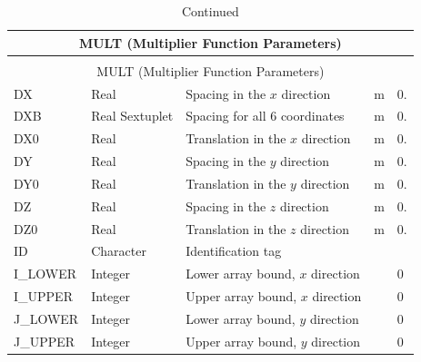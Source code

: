 \documentclass[11pt]{book}
\begin{document}
\begin{longtable}{@{\extracolsep{\fill}}|l|l|l|l|l|}
\caption[Multiplier function parameters ({\ct MULT} namelist group)]{For more information see Section~\ref{info:MULT}.}
\label{tbl:MULT} \\
\hline
\multicolumn{5}{|c|}{{\ct MULT} (Multiplier Function Parameters)} \\
\hline \hline
\endfirsthead
\caption[]{Continued} \\
\hline
\multicolumn{5}{|c|}{{\ct MULT} (Multiplier Function Parameters)} \\
\hline \hline
\endhead
{\ct DX}             & Real             & Spacing in the $x$ direction                & m  & 0.                         \\ \hline
{\ct DXB}            & Real Sextuplet   & Spacing for all 6 coordinates               & m  & 0.                         \\ \hline
{\ct DX0}            & Real             & Translation in the $x$ direction            & m  & 0.                         \\ \hline
{\ct DY}             & Real             & Spacing in the $y$ direction                & m  & 0.                         \\ \hline
{\ct DY0}            & Real             & Translation in the $y$ direction            & m  & 0.                         \\ \hline
{\ct DZ}             & Real             & Spacing in the $z$ direction                & m  & 0.                         \\ \hline
{\ct DZ0}            & Real             & Translation in the $z$ direction            & m  & 0.                         \\ \hline
{\ct ID }            & Character        & Identification tag                          &    &                            \\ \hline
{\ct I\_LOWER}       & Integer          & Lower array bound, $x$ direction            &    & 0                          \\ \hline
{\ct I\_UPPER}       & Integer          & Upper array bound, $x$ direction            &    & 0                          \\ \hline
{\ct J\_LOWER}       & Integer          & Lower array bound, $y$ direction            &    & 0                          \\ \hline
{\ct J\_UPPER}       & Integer          & Upper array bound, $y$ direction            &    & 0                          \\ \hline

\end{longtable}
\end{document}
